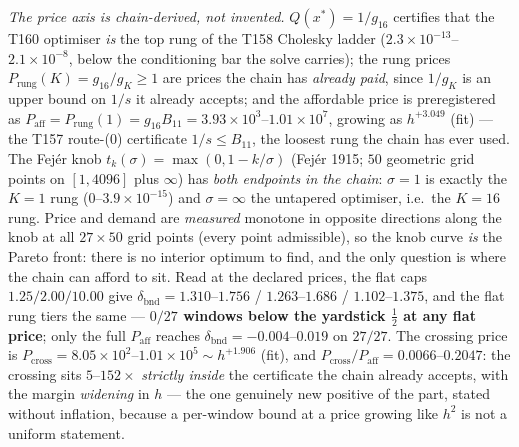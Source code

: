 \documentclass[11pt,a4paper]{article}
\begin{document}
\emph{The price axis is chain-derived, not invented.} $Q(x^*)=1/g_{16}$
certifies that the T160 optimiser \emph{is} the top rung of the T158 Cholesky
ladder ($2.3\times10^{-13}$--$2.1\times10^{-8}$, below the conditioning bar
the solve carries); the rung prices $P_{\mathrm{rung}}(K)=g_{16}/g_K\ge1$ are
prices the chain has \emph{already paid}, since $1/g_K$ is an upper bound on
$1/s$ it already accepts; and the affordable price is preregistered as
$P_{\mathrm{aff}}=P_{\mathrm{rung}}(1)=g_{16}B_{11}=3.93\times10^{3}$--$1.01\times10^{7}$,
growing as $h^{+3.049}$ (fit) --- the T157 route-(0) certificate
$1/s\le B_{11}$, the loosest rung the chain has ever used. The Fej\'er knob
$t_k(\sigma)=\max(0,1-k/\sigma)$ (Fej\'er 1915; $50$ geometric grid points on
$[1,4096]$ plus $\infty$) has \emph{both endpoints in the chain}: $\sigma=1$
is exactly the $K=1$ rung ($0$--$3.9\times10^{-15}$) and $\sigma=\infty$ the
untapered optimiser, i.e.\ the $K=16$ rung. Price and demand are
\emph{measured} monotone in opposite directions along the knob at all
$27\times50$ grid points (every point admissible), so the knob curve \emph{is}
the Pareto front: there is no interior optimum to find, and the only question
is where the chain can afford to sit. Read at the declared prices, the flat
caps $1.25/2.00/10.00$ give $\delta_{\mathrm{bnd}}=1.310$--$1.756$ /
$1.263$--$1.686$ / $1.102$--$1.375$, and the flat rung tiers the same ---
\textbf{$0/27$ windows below the yardstick $\tfrac12$ at any flat price};
only the full $P_{\mathrm{aff}}$ reaches
$\delta_{\mathrm{bnd}}=-0.004$--$0.019$ on $27/27$. The crossing price is
$P_{\mathrm{cross}}=8.05\times10^{2}$--$1.01\times10^{5}\sim h^{+1.906}$
(fit), and $P_{\mathrm{cross}}/P_{\mathrm{aff}}=0.0066$--$0.2047$: the
crossing sits $5$--$152\times$ \emph{strictly inside} the certificate the
chain already accepts, with the margin \emph{widening} in $h$ --- the one
genuinely new positive of the part, stated without inflation, because a
per-window bound at a price growing like $h^2$ is not a uniform statement.
\end{document}
